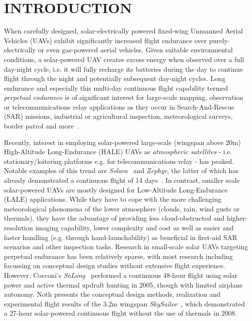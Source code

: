 \section{INTRODUCTION}


When carefully designed, solar-electrically powered fixed-wing Unmanned Aerial Vehicles (UAVs) exhibit significantly increased flight endurance over purely-electrically or even gas-powered aerial vehicles. Given suitable environmental conditions, a solar-powered UAV creates excess energy when observed over a full day-night cycle, i.e. it will fully recharge its batteries during the day to continue flight through the night and potentially subsequent day-night cycles. Long endurance and especially this multi-day continuous flight capability termed \emph{perpetual endurance} is of significant interest for large-scale mapping, observation or telecommunications relay applications as they occur in Search-And-Rescue (SAR) missions, industrial or agricultural inspection, meteorological surveys, border patrol and more~\cite{NASA_Pathfinder}.

Recently, interest in employing solar-powered large-scale (wingspan above 20m) High-Altitude Long-Endurance (HALE) UAVs as \emph{atmospheric satellites} - i.e. stationary/loitering platforms e.g. for telecommunications relay - has peaked. Notable examples of this trend are \textit{Solara}~\cite{IEEE_AtmosphericSatellites} and \textit{Zephyr}, the latter of which has already demonstrated a continuous flight of 14 days~\cite{QinetiQ_Zephyr14dayRecord}. In contrast, smaller scale solar-powered UAVs are mostly designed for Low-Altitude Long-Endurance (LALE) applications. While they have to cope with the more challenging meteorological phenomena of the lower atmosphere (clouds, rain, wind gusts or thermals), they have the advantage of providing less cloud-obstructed and higher-resolution imaging capability, lower complexity and cost as well as easier and faster handling (e.g. through hand-launchability) as beneficial in first-aid SAR scenarios and other inspection tasks. Research in small-scale solar UAVs targeting perpetual endurance has been relatively sparse, with most research including~\cite{Morton_ICRA2013} focussing on conceptual design studies without extensive flight experience. However, Cocconi's \textit{SoLong}~\cite{Cocconi_SoLong} performed a continuous 48-hour flight using solar power and active thermal updraft hunting in 2005, though with limited airplane autonomy. Noth presents the conceptual design methods, realization and experimental flight results of the 3.2m wingspan \textit{SkySailor}~\cite{Noth_PhD}, which demonstrated a 27-hour solar-powered continuous flight without the use of thermals in 2008. 

